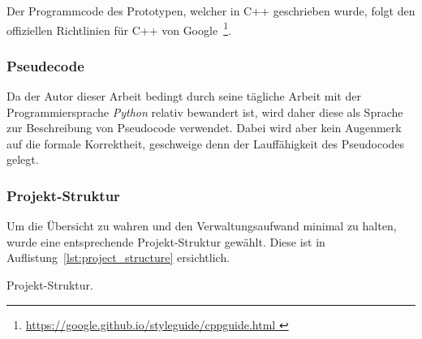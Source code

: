 Der Programmcode des Prototypen, welcher in C++ geschrieben wurde, folgt
den offiziellen Richtlinien für C++ von Google~\footnote{
    \href{https://google.github.io/styleguide/cppguide.html}{
        https://google.github.io/styleguide/cppguide.html
    }
}.

\subsubsection{Pseudecode}
\label{ssubsec:standards_guidelines:psuedocode}

Da der Autor dieser Arbeit bedingt durch seine tägliche Arbeit mit der
Programmiersprache \textit{Python} relativ bewandert ist, wird daher diese als
Sprache zur Beschreibung von Pseudocode verwendet.  Dabei wird aber kein
Augenmerk auf die formale Korrektheit, geschweige denn der Lauffähigkeit
des Pseudocodes gelegt.

\subsubsection{Projekt-Struktur}
\label{ssubsec:standards_guidelines:project_structure}

Um die Übersicht zu wahren und den Verwaltungsaufwand minimal zu halten,
wurde eine entsprechende Projekt-Struktur gewählt. Diese ist in
Auflistung~\ref{lst:project_structure} ersichtlich.

\begin{listing}
	\caption{Projekt-Struktur.}\label{lst:project_structure}
\end{listing}
